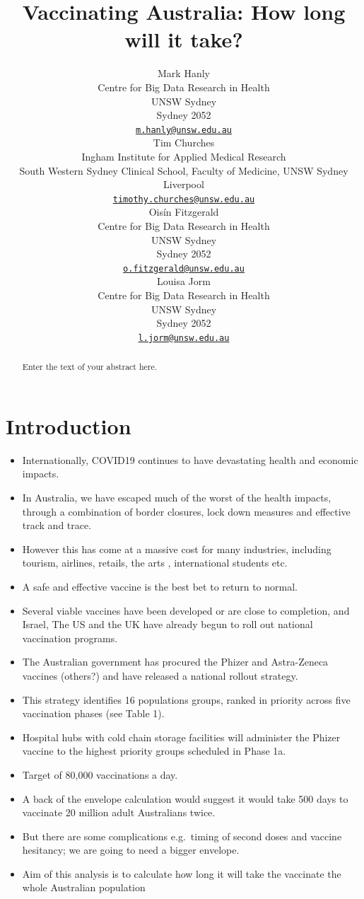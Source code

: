 \documentclass{article}
\title{Vaccinating Australia: How long will it take?}
\author{
    Mark Hanly
   \\
    Centre for Big Data Research in Health \\
    UNSW Sydney \\
  Sydney 2052 \\
  \texttt{\href{mailto:m.hanly@unsw.edu.au}{\nolinkurl{m.hanly@unsw.edu.au}}} \\
   \And
    Tim Churches
   \\
    Ingham Institute for Applied Medical Research \\
    South Western Sydney Clinical School, Faculty of Medicine, UNSW Sydney \\
  Liverpool \\
  \texttt{\href{mailto:timothy.churches@unsw.edu.au}{\nolinkurl{timothy.churches@unsw.edu.au}}} \\
   \And
    Oisín Fitzgerald
   \\
    Centre for Big Data Research in Health \\
    UNSW Sydney \\
  Sydney 2052 \\
  \texttt{\href{mailto:o.fitzgerald@unsw.edu.au}{\nolinkurl{o.fitzgerald@unsw.edu.au}}} \\
   \And
    Louisa Jorm
   \\
    Centre for Big Data Research in Health \\
    UNSW Sydney \\
  Sydney 2052 \\
  \texttt{\href{mailto:l.jorm@unsw.edu.au}{\nolinkurl{l.jorm@unsw.edu.au}}} \\
  }
\begin{document}
\maketitle

\def\tightlist{}


\begin{abstract}
Enter the text of your abstract here.
\end{abstract}


\hypertarget{introduction}{%
\section{Introduction}\label{introduction}}

\begin{itemize}
\tightlist
\item
  Internationally, COVID19 continues to have devastating health and
  economic impacts.
\item
  In Australia, we have escaped much of the worst of the health impacts,
  through a combination of border closures, lock down measures and
  effective track and trace.
\item
  However this has come at a massive cost for many industries, including
  tourism, airlines, retails, the arts , international students etc.
\item
  A safe and effective vaccine is the best bet to return to normal.
\item
  Several viable vaccines have been developed or are close to
  completion, and Israel, The US and the UK have already begun to roll
  out national vaccination programs.
\item
  The Australian government has procured the Phizer and Astra-Zeneca
  vaccines (others?) and have released a national rollout strategy.
\item
  This strategy identifies 16 populations groups, ranked in priority
  across five vaccination phases (see Table 1).
\item
  Hospital hubs with cold chain storage facilities will administer the
  Phizer vaccine to the highest priority groups scheduled in Phase 1a.
\item
  Target of 80,000 vaccinations a day.
\item
  A back of the envelope calculation would suggest it would take 500
  days to vaccinate 20 million adult Australians twice.
\item
  But there are some complications e.g.~timing of second doses and
  vaccine hesitancy; we are going to need a bigger envelope.
\item
  Aim of this analysis is to calculate how long it will take the
  vaccinate the whole Australian population
\end{itemize}
\end{document}

